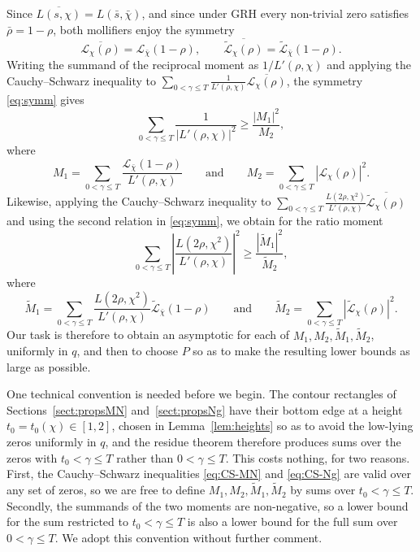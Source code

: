 \documentclass[12pt,a4paper,reqno]{amsart}
\theoremstyle{remark}
\numberwithin{equation}{section}
\begin{document}
Since $\overline{L(s,\chi)}=L(\bar s,\bar\chi)$, and since under GRH every non-trivial zero satisfies $\bar\rho=1-\rho$, both mollifiers enjoy the symmetry
\begin{equation}\label{eq:symm}
\overline{\mathcal{L}_{\chi}(\rho)}=\mathcal{L}_{\bar\chi}(1-\rho),
\qquad
\overline{\widetilde{\mathcal{L}}_{\chi}(\rho)}=\widetilde{\mathcal{L}}_{\bar\chi}(1-\rho).
\end{equation}
Writing the summand of the reciprocal moment as $1/L'(\rho,\chi)$ and applying the Cauchy--Schwarz inequality to $\sum_{0<\gamma\le T}\frac{1}{L'(\rho,\chi)}\overline{\mathcal{L}_\chi(\rho)}$, the symmetry \eqref{eq:symm} gives
\begin{equation}\label{eq:CS-MN}
\sum_{0<\gamma\le T}\frac{1}{|L'(\rho,\chi)|^2}\ge\frac{|M_1|^2}{M_2},
\end{equation}
where
\[
M_1=\sum_{0<\gamma\le T}\frac{\mathcal{L}_{\bar\chi}(1-\rho)}{L'(\rho,\chi)}
\qquad\text{and}\qquad
M_2=\sum_{0<\gamma\le T}|\mathcal{L}_{\chi}(\rho)|^2 .
\]
Likewise, applying the Cauchy--Schwarz inequality to $\sum_{0<\gamma\le T}\frac{L(2\rho,\chi^2)}{L'(\rho,\chi)}\overline{\widetilde{\mathcal{L}}_\chi(\rho)}$ and using the second relation in \eqref{eq:symm}, we obtain for the ratio moment
\begin{equation}\label{eq:CS-Ng}
\sum_{0<\gamma\le T}\left|\frac{L(2\rho,\chi^2)}{L'(\rho,\chi)}\right|^2\ge\frac{|\widetilde M_1|^2}{\widetilde M_2},
\end{equation}
where
\[
\widetilde M_1=\sum_{0<\gamma\le T}\frac{L(2\rho,\chi^2)}{L'(\rho,\chi)}\widetilde{\mathcal{L}}_{\bar\chi}(1-\rho)
\qquad\text{and}\qquad
\widetilde M_2=\sum_{0<\gamma\le T}|\widetilde{\mathcal{L}}_{\chi}(\rho)|^2 .
\]
Our task is therefore to obtain an asymptotic for each of $M_1,M_2,\widetilde M_1,\widetilde M_2$, uniformly in $q$, and then to choose $P$ so as to make the resulting lower bounds as large as possible.

One technical convention is needed before we begin. The contour rectangles of Sections~\ref{sect:propsMN} and~\ref{sect:propsNg} have their bottom edge at a height $t_0=t_0(\chi)\in[1,2]$, chosen in Lemma~\ref{lem:heights} so as to avoid the low-lying zeros uniformly in $q$, and the residue theorem therefore produces sums over the zeros with $t_0<\gamma\le T$ rather than $0<\gamma\le T$. This costs nothing, for two reasons. First, the Cauchy--Schwarz inequalities \eqref{eq:CS-MN} and \eqref{eq:CS-Ng} are valid over any set of zeros, so we are free to define $M_1,M_2,\widetilde M_1,\widetilde M_2$ by sums over $t_0<\gamma\le T$. Secondly, the summands of the two moments are non-negative, so a lower bound for the sum restricted to $t_0<\gamma\le T$ is also a lower bound for the full sum over $0<\gamma\le T$. We adopt this convention without further comment.
\end{document}
